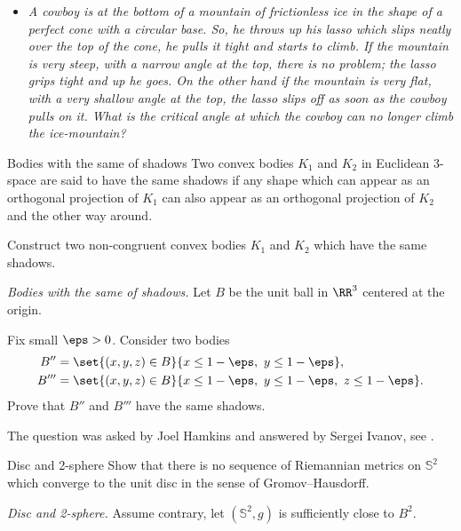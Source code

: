 \begin{itemize}
\item \textit{ 
A cowboy is at the bottom of a mountain of frictionless ice in the shape of a perfect cone with a circular base. 
So, he throws up his lasso which slips neatly over the top of the cone, he pulls it tight and starts to climb. If the mountain is very steep, with a narrow angle at the top, there is no problem; the lasso grips tight and up he goes. On the other hand if the mountain is very flat, with a very shallow angle at the top, the lasso slips off as soon as the cowboy pulls on it. 
What is the critical angle at which the cowboy can no longer climb the ice-mountain?}
\end{itemize}


\begin{pr}{\easy}{Bodies with the same of shadows}\label{Bodies with the same of shadows}
Two convex bodies $K_1$ and $K_2$ in Euclidean 3-space are said to have the same shadows if any shape which can appear as an orthogonal projection of $K_1$ can also appear as an orthogonal projection of $K_2$ and the other way around.

Construct two non-congruent convex bodies $K_1$ and $K_2$ which have the same shadows.
\end{pr}

\textit{Bodies with the same of shadows.}
Let $B$ be the unit ball in $\RR^3$ centered at the origin.

Fix small $\eps>0$.
Consider two bodies 
\begin{align*}
B''&=\set{(x,y,z)\in B}{x\le 1-\eps,\  y\le 1-\eps},
\\ 
B'''&=\set{(x,y,z)\in B}{x\le 1-\eps,\  y\le 1-\eps,\  z\le 1-\eps}.
\end{align*}
Prove that $B''$ and $B'''$ have the same shadows.

 The question was asked by Joel Hamkins and answered by Sergei Ivanov, see \cite{hamkins}.









\begin{pr}{}{Disc and 2-sphere}\label{2-sphere is far from a ball}
Show that there is no sequence of Riemannian metrics on
$\mathbb{S}^2$ which converge to the unit disc in the sense of Gromov--Hausdorff.
\end{pr}
\textit{Disc and 2-sphere.}
Assume contrary, let $(\mathbb{S}^2,g)$ is sufficiently close to $B^2$.

